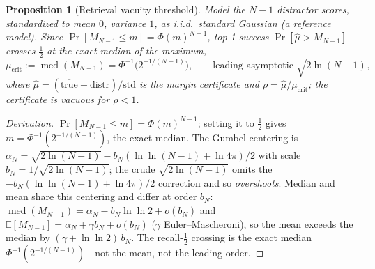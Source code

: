 \documentclass[lettersize,onecolumn]{IEEEtran}
\newtheorem{proposition}{Proposition}
\theoremstyle{definition}
\theoremstyle{remark}
\newcommand{\E}{\mathbb{E}}
\begin{document}
\begin{proposition}[Retrieval vacuity threshold]\label{prop:capacity}
Model the $N\!-\!1$ distractor scores, standardized to mean $0$, variance $1$, as
i.i.d.\ standard Gaussian (a reference model). Since $\Pr[M_{N-1}\le m]=\Phi(m)^{N-1}$,
top-1 success $\Pr[\hat\mu>M_{N-1}]$ crosses $\tfrac12$ at the \emph{exact median}
of the maximum,
\[
\mu_{\mathrm{crit}}:=\operatorname{med}(M_{N-1})=\Phi^{-1}\!\big(2^{-1/(N-1)}\big),
\qquad \text{leading asymptotic }\sqrt{2\ln(N{-}1)},
\]
where $\hat\mu=(\overline{\text{true}}-\overline{\text{distr}})/\mathrm{std}$ is the
margin certificate and $\rho=\hat\mu/\mu_{\mathrm{crit}}$; the certificate is
\emph{vacuous} for $\rho<1$.
\end{proposition}
\begin{proof}[Derivation]
$\Pr[M_{N-1}\le m]=\Phi(m)^{N-1}$; setting it to $\tfrac12$ gives $m=\Phi^{-1}(2^{-1/(N-1)})$,
the exact median. The Gumbel centering is $\alpha_N=\sqrt{2\ln(N{-}1)}-b_N(\ln\ln(N{-}1)
+\ln4\pi)/2$ with scale $b_N=1/\sqrt{2\ln(N{-}1)}$; the crude $\sqrt{2\ln(N{-}1)}$
omits the $-b_N(\ln\ln(N{-}1)+\ln4\pi)/2$ correction and so \emph{overshoots}. Median
and mean share this centering and differ at order $b_N$:
$\operatorname{med}(M_{N-1})=\alpha_N-b_N\ln\ln2+o(b_N)$ and
$\E[M_{N-1}]=\alpha_N+\gamma b_N+o(b_N)$ ($\gamma$ Euler--Mascheroni), so the mean
exceeds the median by $(\gamma+\ln\ln2)\,b_N$. The recall-$\tfrac12$ crossing is the
exact median $\Phi^{-1}(2^{-1/(N-1)})$---not the mean, not the leading order.
\end{proof}
\end{document}
